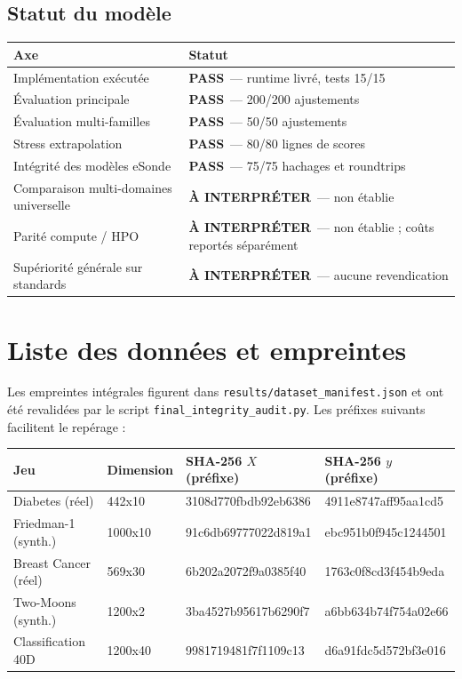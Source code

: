 \documentclass[11pt,a4paper]{article}
\newcommand{\PASS}{\textcolor{green!45!black}{\textbf{PASS}}}
\newcommand{\WARN}{\textcolor{orange!70!black}{\textbf{À INTERPRÉTER}}}
\begin{document}
\subsection*{Statut du modèle}
\begin{tabularx}{\textwidth}{p{4.1cm}X}
\toprule Axe & Statut\\\midrule
Implémentation exécutée & \PASS\ — runtime livré, tests 15/15\\
Évaluation principale & \PASS\ — 200/200 ajustements\\
Évaluation multi-familles & \PASS\ — 50/50 ajustements\\
Stress extrapolation & \PASS\ — 80/80 lignes de scores\\
Intégrité des modèles eSonde & \PASS\ — 75/75 hachages et roundtrips\\
Comparaison multi-domaines universelle & \WARN\ — non établie\\
Parité compute / HPO & \WARN\ — non établie ; coûts reportés séparément\\
Supériorité générale sur standards & \WARN\ — aucune revendication\\
\bottomrule
\end{tabularx}

\appendix
\section{Liste des données et empreintes}
Les empreintes intégrales figurent dans \texttt{results/dataset\_manifest.json} et ont été revalidées par le script \texttt{final\_integrity\_audit.py}. Les préfixes suivants facilitent le repérage :
\begin{longtable}{p{3.0cm}p{1.5cm}p{4.4cm}p{4.4cm}}
\toprule Jeu & Dimension & SHA-256 $X$ (préfixe) & SHA-256 $y$ (préfixe)\\\midrule\endhead
Diabetes (réel) & 442x10 & 3108d770fbdb92eb6386 & 4911e8747aff95aa1cd5 \\
Friedman-1 (synth.) & 1000x10 & 91c6db69777022d819a1 & ebc951b0f945c1244501 \\
Breast Cancer (réel) & 569x30 & 6b202a2072f9a0385f40 & 1763c0f8cd3f454b9eda \\
Two-Moons (synth.) & 1200x2 & 3ba4527b95617b6290f7 & a6bb634b74f754a02e66 \\
Classification 40D & 1200x40 & 9981719481f7f1109c13 & d6a91fdc5d572bf3e016 \\
\bottomrule\end{longtable}
\end{document}

